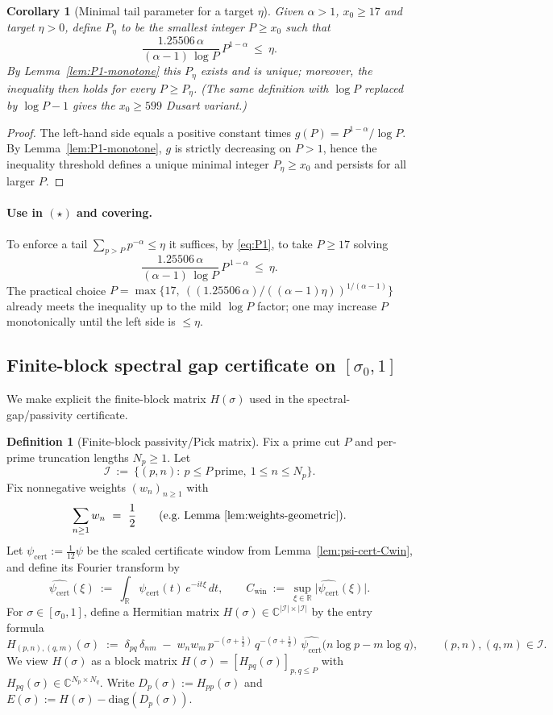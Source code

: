 \documentclass[11pt]{article}
\newtheorem{corollary}[theorem]{Corollary}
\theoremstyle{definition}
\newtheorem{definition}[theorem]{Definition}
\theoremstyle{remark}
\theoremstyle{definition}
\newcommand{\C}{\mathbb{C}}
\newcommand{\R}{\mathbb{R}}
\begin{document}
\begin{corollary}[Minimal tail parameter for a target $\eta$]\label{cor:P1-minP}
Given $\alpha>1$, $x_0\ge 17$ and target $\eta>0$, define $P_\eta$ to be the smallest integer $P\ge x_0$ such that
\[
\frac{1.25506\,\alpha}{(\alpha-1)\,\log P}\,P^{1-\alpha}\ \le\ \eta.
\]
By Lemma~\ref{lem:P1-monotone} this $P_\eta$ exists and is unique; moreover, the inequality then holds for every $P\ge P_\eta$. (The same definition with $\log P$ replaced by $\log P-1$ gives the $x_0\ge 599$ Dusart variant.)
\end{corollary}
\begin{proof}
The left-hand side equals a positive constant times $g(P)=P^{1-\alpha}/\log P$. By Lemma~\ref{lem:P1-monotone}, $g$ is strictly decreasing on $P>1$, hence the inequality threshold defines a unique minimal integer $P_\eta\ge x_0$ and persists for all larger $P$.
\end{proof}
\paragraph{Use in $(\star)$ and covering.}
To enforce a tail $\sum_{p>P}p^{-\alpha}\le \eta$ it suffices, by \eqref{eq:P1}, to take $P\ge17$ solving
\[
 \frac{1.25506\,\alpha}{(\alpha-1)\,\log P}\,P^{\,1-\alpha}\ \le\ \eta.
\]
The practical choice $P=\max\{17,\ ((1.25506\,\alpha)/((\alpha-1)\eta))^{1/(\alpha-1)}\}$ already meets the inequality up to the mild $\log P$ factor; one may increase $P$ monotonically until the left side is $\le\eta$.
\subsection*{Finite-block spectral gap certificate on $[\sigma_0,1]$}
We make explicit the finite-block matrix $H(\sigma)$ used in the spectral-gap/passivity certificate.

\begin{definition}[Finite-block passivity/Pick matrix]\label{def:finite-block-passivity-matrix}
Fix a prime cut $P$ and per-prime truncation lengths $N_p\ge 1$. Let
\[
  \mathcal I\ :=\ \{(p,n):\ p\le P\ \text{prime},\ 1\le n\le N_p\}.
\]
Fix nonnegative weights $(w_n)_{n\ge 1}$ with
\[
  \sum_{n\ge 1} w_n\ =\ \frac12
  \qquad\text{(e.g.\ Lemma~\ref{lem:weights-geometric}).}
\]
Let $\psi_{\mathrm{cert}}:=\tfrac1{12}\psi$ be the scaled certificate window from Lemma~\ref{lem:psi-cert-Cwin}, and define its Fourier transform by
\[
  \widehat{\psi_{\mathrm{cert}}}(\xi)\ :=\ \int_{\R}\psi_{\mathrm{cert}}(t)\,e^{-it\xi}\,dt,\qquad
  C_{\mathrm{win}}\ :=\ \sup_{\xi\in\R}\big|\widehat{\psi_{\mathrm{cert}}}(\xi)\big|.
\]
For $\sigma\in[\sigma_0,1]$, define a Hermitian matrix $H(\sigma)\in\C^{|\mathcal I|\times|\mathcal I|}$ by the entry formula
\[
  H_{(p,n),(q,m)}(\sigma)\;:=\;\delta_{pq}\,\delta_{nm}\;-\;w_n w_m\,
  p^{-(\sigma+\tfrac12)}\,q^{-(\sigma+\tfrac12)}\,
  \widehat{\psi_{\mathrm{cert}}}\!\big(n\log p-m\log q\big),
  \qquad (p,n),(q,m)\in\mathcal I.
\]
We view $H(\sigma)$ as a block matrix $H(\sigma)=[H_{pq}(\sigma)]_{p,q\le P}$ with $H_{pq}(\sigma)\in\C^{N_p\times N_q}$.
Write $D_p(\sigma):=H_{pp}(\sigma)$ and $E(\sigma):=H(\sigma)-\mathrm{diag}(D_p(\sigma))$.
\end{definition}
\end{document}
